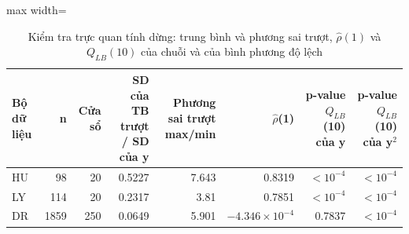 \begin{table}[H]
\centering\footnotesize
\caption{Kiểm tra trực quan tính dừng: trung bình và phương sai trượt, $\hat\rho(1)$ và $Q_{LB}(10)$ của chuỗi và của bình phương độ lệch}\label{tab:tab_b11_01_stationarity}
\begin{adjustbox}{max width=\linewidth}
\begin{tabular}{|l|r|r|r|r|r|r|r|}
\toprule
Bộ dữ liệu & n & Cửa sổ & SD của TB trượt / SD của y & Phương sai trượt max/min & $\hat{\rho}$(1) & p-value $Q_{LB}$(10) của y & p-value $Q_{LB}$(10) của y$^{2}$ \\
\midrule
HU & 98 & 20 & 0.5227 & 7.643 & 0.8319 & $<10^{-4}$ & $<10^{-4}$ \\
LY & 114 & 20 & 0.2317 & 3.81 & 0.7851 & $<10^{-4}$ & $<10^{-4}$ \\
DR & 1859 & 250 & 0.0649 & 5.901 & $-4.346\times10^{-4}$ & 0.7837 & $<10^{-4}$ \\
\bottomrule
\end{tabular}
\end{adjustbox}\par{}
\end{table}
